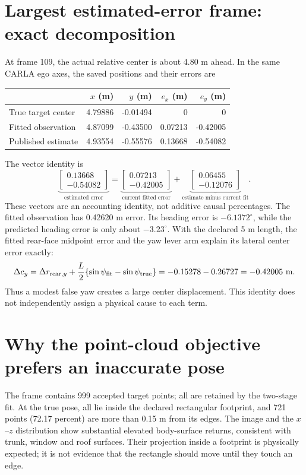 \documentclass[11pt]{article}
\begin{document}
\section{Largest estimated-error frame: exact decomposition}
At frame 109, the actual relative center is about 4.80 m ahead. In the same
CARLA ego axes, the saved positions and their errors are
\begin{center}\small
\begin{tabular}{@{}lrrrr@{}}\toprule
 & $x$ (m) & $y$ (m) & $e_x$ (m) & $e_y$ (m) \\\midrule
True target center & 4.79886 & -0.01494 & 0 & 0 \\
Fitted observation & 4.87099 & -0.43500 & 0.07213 & -0.42005 \\
Published estimate & 4.93554 & -0.55576 & 0.13668 & -0.54082 \\
\bottomrule\end{tabular}
\end{center}
The vector identity is
\[
 \underbrace{\begin{bmatrix}0.13668\\-0.54082\end{bmatrix}}_{\text{estimated error}}
 =\underbrace{\begin{bmatrix}0.07213\\-0.42005\end{bmatrix}}_{\text{current fitted error}}
 +\underbrace{\begin{bmatrix}0.06455\\-0.12076\end{bmatrix}}_{\text{estimate minus current fit}}.
\]
These vectors are an accounting identity, not additive causal percentages.
The fitted observation has 0.42620 m error. Its heading error is
$-6.1372^\circ$, while the predicted heading error is only about
$-3.23^\circ$. With the declared 5 m length, the fitted rear-face midpoint
error and the yaw lever arm explain its lateral center error exactly:
\[
 \Delta c_y=\Delta r_{\mathrm{rear},y}
 +\frac L2\{\sin\psi_{\rm fit}-\sin\psi_{\rm true}\}
 =-0.15278-0.26727=-0.42005\ \mathrm{m}.
\]
Thus a modest false yaw creates a large center displacement. This identity
does not independently assign a physical cause to each term.

\section{Why the point-cloud objective prefers an inaccurate pose}
The frame contains 999 accepted target points; all are retained by the
two-stage fit. At the true pose, all lie inside the declared rectangular
footprint, and 721 points (72.17 percent) are more than 0.15 m from its edges.
The image and the $x$--$z$ distribution show substantial elevated body-surface
returns, consistent with trunk, window and roof surfaces. Their projection
inside a footprint is physically expected; it is not evidence that the
rectangle should move until they touch an edge.
\end{document}
